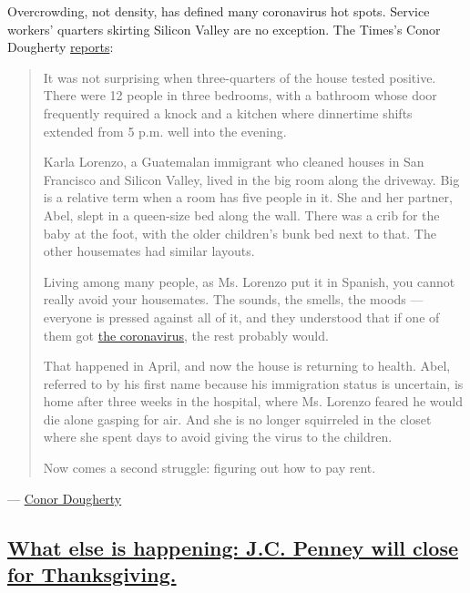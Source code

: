 Overcrowding, not density, has defined many coronavirus hot spots.
Service workers' quarters skirting Silicon Valley are no exception. The
Times's Conor Dougherty
\href{https://www.nytimes3xbfgragh.onion/2020/08/01/business/economy/housing-overcrowding-coronavirus.html}{reports}:

\begin{quote}
It was not surprising when three-quarters of the house tested positive.
There were 12 people in three bedrooms, with a bathroom whose door
frequently required a knock and a kitchen where dinnertime shifts
extended from 5 p.m. well into the evening.

Karla Lorenzo, a Guatemalan immigrant who cleaned houses in San
Francisco and Silicon Valley, lived in the big room along the driveway.
Big is a relative term when a room has five people in it. She and her
partner, Abel, slept in a queen-size bed along the wall. There was a
crib for the baby at the foot, with the older children's bunk bed next
to that. The other housemates had similar layouts.

Living among many people, as Ms. Lorenzo put it in Spanish, you cannot
really avoid your housemates. The sounds, the smells, the moods ---
everyone is pressed against all of it, and they understood that if one
of them got
\href{https://www.nytimes3xbfgragh.onion/news-event/coronavirus}{the
coronavirus}, the rest probably would.

That happened in April, and now the house is returning to health. Abel,
referred to by his first name because his immigration status is
uncertain, is home after three weeks in the hospital, where Ms. Lorenzo
feared he would die alone gasping for air. And she is no longer
squirreled in the closet where she spent days to avoid giving the virus
to the children.

Now comes a second struggle: figuring out how to pay rent.
\end{quote}

--- \href{https://www.nytimes3xbfgragh.onion/by/conor-dougherty}{Conor
Dougherty}

\hypertarget{what-else-is-happening-jc-penney-will-close-for-thanksgiving}{%
\subsection{\texorpdfstring{\protect\hyperlink{what-else-is-happening-jc-penney-will-close-for-thanksgiving}{What
else is happening: J.C. Penney will close for
Thanksgiving.}}{What else is happening: J.C. Penney will close for Thanksgiving.}}\label{what-else-is-happening-jc-penney-will-close-for-thanksgiving}}

